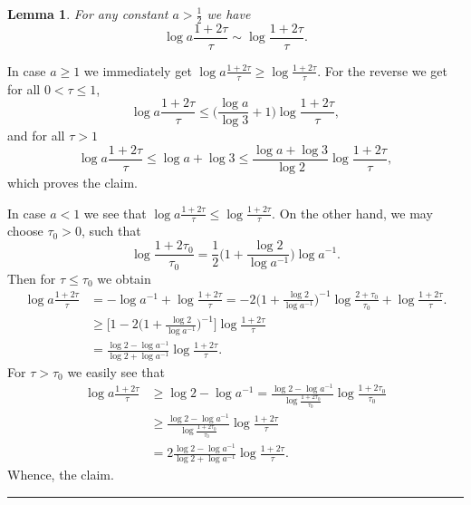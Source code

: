 \documentclass[12pt]{article}
\numberwithin{equation}{section}
\newtheorem{lem}{Lemma}[section]
\theoremstyle{definition}
\begin{document}
\begin{lem}
\label{lem3.3}
For any constant $ a > \frac{1}{2}$ we have 
\begin{equation}
\log a\frac{1+2\tau }{\tau } \sim \log \frac{1+2\tau }{\tau }.
\label{3.6}
\end{equation}

\end{lem}

 In case $ a \ge 1$ we immediately get $\log a\frac{1+2\tau }{\tau } \ge  \log \frac{1+2\tau }{\tau } $. 
For the reverse we get for all $ 0 < \tau \le 1$, 
\[
\log a\frac{1+2\tau }{\tau } \le \Big(\frac{\log a}{\log 3} +1\Big) \log \frac{1+2\tau }{\tau },
\]
and for all $ \tau >1$
\[
\log a\frac{1+2\tau }{\tau } \le \log a + \log 3  \le \frac{\log a + \log 3 }{\log 2} \log \frac{1+2\tau }{\tau },
\]
which proves the claim. 

\hspace{0.5cm}
In case $ a <1$ we see that $\log a\frac{1+2\tau }{\tau } \le  \log \frac{1+2\tau }{\tau } $. 
On the other hand, we may choose $ \tau _0 >0$, such that
\[
\log \frac{1+2\tau_0 }{\tau_0 }= \frac{1}{2} \Big(1+ \frac{\log 2}{\log a^{ -1}}\Big)\log a^{ -1}.
\]
Then for $ \tau  \le  \tau _0$ we obtain 
\begin{align*}
\log a\frac{1+2\tau }{\tau } &= - \log a^{ -1} + \log \frac{1+2\tau }{\tau } 
= - 2 \Big(1+ \frac{\log 2}{\log a^{ -1}}\Big)^{ -1} \log \frac{2+\tau_0 }{\tau_0 } + \log \frac{1+2\tau }{\tau }. 
\\
&\ge \bigg[1- 2 \Big(1+ \frac{\log 2}{\log a^{ -1}}\Big)^{ -1}\bigg] \log \frac{1+2\tau }{\tau }
\\
& = \frac{\log 2- \log a^{ -1}}{\log 2 + \log a^{ -1}}\log \frac{1+2\tau }{\tau }. 
\end{align*}
For $ \tau > \tau _0$ we easily see that 
\begin{align*}
\log a\frac{1+2\tau }{\tau } & \ge \log 2 -   \log a^{ -1} = \frac{\log 2 -   \log a^{ -1} }{\log \frac{1+ 2\tau _0}{\tau _0}} 
\log \frac{1+2\tau_0 }{\tau_0 }
\\
&\ge \frac{\log 2 -   \log a^{ -1} }{\log \frac{1+ 2\tau _0}{\tau _0}} 
\log \frac{1+2\tau}{\tau}
\\
&=2 \frac{\log 2 -   \log a^{ -1} }{\log 2+ \log a^{ -1}} 
\log \frac{1+2\tau}{\tau}. 
\end{align*}
Whence, the claim.  \hfill {\rule{0.2cm}{0.2cm}} 
\end{document}
